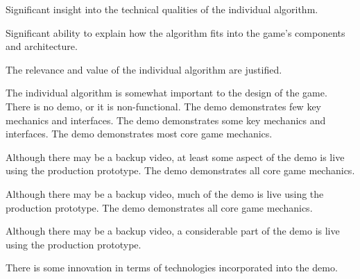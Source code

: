 \documentclass{../fal_assignment}
\begin{document}
\begin{markingrubric}
        \grade Significant insight into the technical qualities of the individual algorithm.
            \par Significant ability to explain how the algorithm fits into the game's components and architecture.
            \par The relevance and value of the  individual algorithm are justified.
            \par The  individual algorithm is somewhat important to the design of the game.
%
        \grade\fail There is no demo, or it is non-functional.
        \grade The demo demonstrates few key mechanics and interfaces.
        \grade The demo demonstrates some key mechanics and interfaces.
        \grade The demo demonstrates most core game mechanics.
            \par Although there may be a backup video, at least some aspect of the demo is live using the production prototype.
        \grade The demo demonstrates all core game mechanics.
            \par Although there may be a backup video, much of the demo is live using the production prototype.
        \grade The demo demonstrates all core game mechanics.
            \par Although there may be a backup video, a considerable part of the demo is live using the production prototype.
            \par There is some innovation in terms of technologies incorporated into the demo.
\end{markingrubric}
\end{document}
